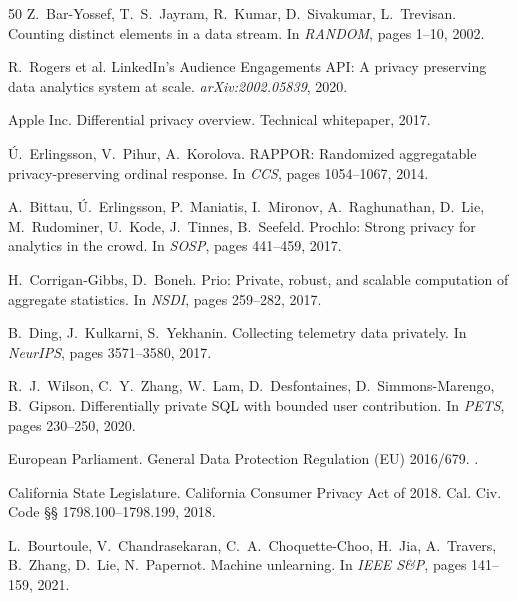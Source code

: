 \documentclass[sigconf,anonymous,review]{acmart}
\begin{document}
\begin{thebibliography}{50}
    Z.~Bar-Yossef, T.~S.~Jayram, R.~Kumar, D.~Sivakumar, L.~Trevisan.
    \newblock Counting distinct elements in a data stream.
    \newblock In \emph{RANDOM}, pages 1--10, 2002.

    R.~Rogers et al.
    \newblock LinkedIn's Audience Engagements API: A privacy preserving data analytics system at scale.
    \newblock \emph{arXiv:2002.05839}, 2020.

    Apple Inc.
    \newblock Differential privacy overview.
    \newblock Technical whitepaper, 2017.

    Ú.~Erlingsson, V.~Pihur, A.~Korolova.
    \newblock RAPPOR: Randomized aggregatable privacy-preserving ordinal response.
    \newblock In \emph{CCS}, pages 1054--1067, 2014.

    A.~Bittau, Ú.~Erlingsson, P.~Maniatis, I.~Mironov, A.~Raghunathan, D.~Lie, M.~Rudominer, U.~Kode, J.~Tinnes, B.~Seefeld.
    \newblock Prochlo: Strong privacy for analytics in the crowd.
    \newblock In \emph{SOSP}, pages 441--459, 2017.

    H.~Corrigan-Gibbs, D.~Boneh.
    \newblock Prio: Private, robust, and scalable computation of aggregate statistics.
    \newblock In \emph{NSDI}, pages 259--282, 2017.

    B.~Ding, J.~Kulkarni, S.~Yekhanin.
    \newblock Collecting telemetry data privately.
    \newblock In \emph{NeurIPS}, pages 3571--3580, 2017.

    R.~J.~Wilson, C.~Y.~Zhang, W.~Lam, D.~Desfontaines, D.~Simmons-Marengo, B.~Gipson.
    \newblock Differentially private SQL with bounded user contribution.
    \newblock In \emph{PETS}, pages 230--250, 2020.

    European Parliament.
    \newblock General Data Protection Regulation (EU) 2016/679.
    .

    California State Legislature.
    \newblock California Consumer Privacy Act of 2018.
    \newblock Cal. Civ. Code §§ 1798.100--1798.199, 2018.

    L.~Bourtoule, V.~Chandrasekaran, C.~A.~Choquette-Choo, H.~Jia, A.~Travers, B.~Zhang, D.~Lie, N.~Papernot.
    \newblock Machine unlearning.
    \newblock In \emph{IEEE S\&P}, pages 141--159, 2021.


\end{thebibliography}
\end{document}
